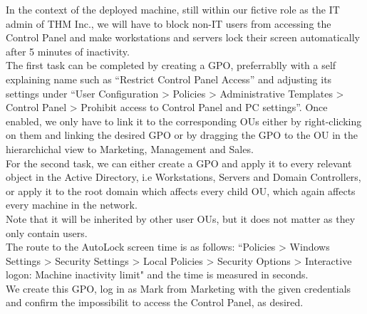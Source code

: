 {In the context of the deployed machine, still within our fictive role as the IT admin of THM Inc., we will have to block non-IT users from accessing the Control Panel and make workstations and servers lock their screen automatically after 5 minutes of inactivity.\\

The first task can be completed by creating a GPO, preferrablly with a self explaining name such as ``Restrict Control Panel Access'' and adjusting its settings under ``User Configuration > Policies > Administrative Templates > Control Panel > Prohibit access to Control Panel and PC settings''. Once enabled, we only have to link it to the corresponding OUs either by right-clicking on them and linking the desired GPO or by dragging the GPO to the OU in the hierarchichal view to Marketing, Management and Sales.\\

For the second task, we can either create a GPO and apply it to every relevant object in the Active Directory, i.e Workstations, Servers and Domain Controllers, or apply it to the root domain which affects every child OU, which again affects every machine in the network.\\
Note that it will be inherited by other user OUs, but it does not matter as they only contain users.\\
The route to the AutoLock screen time is as follows:
``Policies > Windows Settings > Security Settings > Local Policies > Security Options > Interactive logon: Machine inactivity limit" and the time is measured in seconds.\\

We create this GPO, log in as Mark from Marketing with the given credentials and confirm the impossibilit to access the Control Panel, as desired. \\

}
